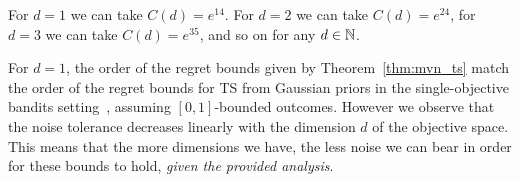 \begin{remark}
\label{remark:const_c}
    For $d = 1$ we can take $C(d) = e^{14}$. For $d = 2$ we can take $C(d) = e^{24}$, for $d = 3$ we can take $C(d) = e^{35}$, and so on for any $d \in \mathbb{N}$.
\end{remark}

For $d = 1$, the order of the regret bounds given by Theorem~\ref{thm:mvn_ts} match the order of the regret bounds for TS from Gaussian priors in the single-objective bandits setting~\cite{Agrawal2013}, assuming $[0, 1]$-bounded outcomes. However we observe that the noise tolerance decreases linearly with the dimension $d$ of the objective space. This means that the more dimensions we have, the less noise we can bear in order for these bounds to hold, \emph{given the provided analysis}. 
